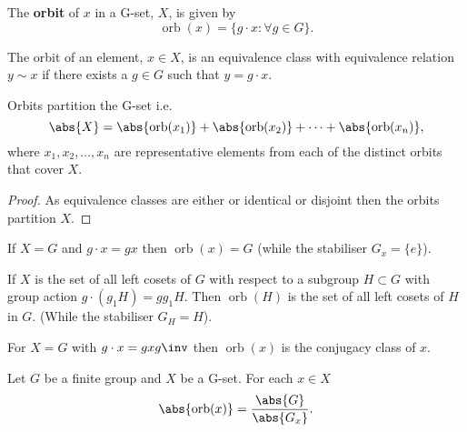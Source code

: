 \documentclass[12pt, a4paper]{article}
\DeclareMathOperator{\orb}{orb}
\begin{document}
\begin{definition}
    The \textbf{orbit} of \(x\) in a G-set, \(X\), is given by
    \[\orb(x)=\{g\cdot x : \forall g \in G\}.\]
\end{definition}

\begin{mdthm}
    The orbit of an element, \(x\in X\), is an equivalence class with equivalence relation \(y \sim x\) if there exists a \(g\in G\) such that \(y=g\cdot x\).
\end{mdthm}

\begin{corollary}
    Orbits partition the G-set i.e.
    \[\abs{X}=\abs{\orb(x_1)}+\abs{\orb(x_2)}+\cdots+\abs{\orb(x_n)},\]
    where \(x_1,x_2,\ldots, x_n\) are representative elements from each of the distinct orbits that cover \(X\).
\end{corollary}

\begin{proof}
    As equivalence classes are either or identical or disjoint then the orbits partition \(X\).
\end{proof}

\begin{example}
    If \(X=G\) and \(g \cdot x =gx\) then \(\orb(x)=G\) (while the stabiliser \(G_x=\{e\}\)).
\end{example}

\begin{mdexample}
    If \(X\) is the set of all left cosets of \(G\) with respect to a subgroup \(H\subset G\) with group action \(g \cdot (g_1 H)=gg_1 H\). Then \(\orb(H)\) is the set of all left cosets of \(H\) in \(G\). (While the stabiliser \(G_H=H\)).
\end{mdexample}

\begin{example}
    For \(X=G\) with \(g \cdot x=gxg\inv\) then \(\orb(x)\) is the conjugacy class of \(x\).
\end{example}

\begin{mdthm}
    Let \(G\) be a finite group and \(X\) be a G-set. For each \(x\in X\)
    \[\abs{\orb(x)}=\frac{\abs{G}}{\abs{G_x}}.\]
\end{mdthm}
\end{document}
